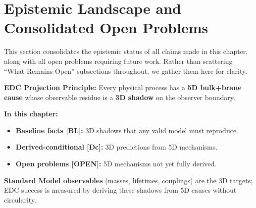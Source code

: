 
\section{Epistemic Landscape and Consolidated Open Problems}
\label{sec:epistemic_map}

This section consolidates the epistemic status of all claims made in this chapter,
along with all open problems requiring future work. Rather than scattering ``What
Remains Open'' subsections throughout, we gather them here for clarity.

\begin{tcolorbox}[breakable, enhanced, colback=blue!3!white, colframe=blue!50!black,
    title=\textbf{Framework 2.0 Language Compliance}, width=\linewidth]
\small
\textbf{EDC Projection Principle:} Every physical process has a \textbf{5D bulk+brane cause}
whose observable residue is a \textbf{3D shadow} on the observer boundary.

\textbf{In this chapter:}
\begin{itemize}[nosep]
    \item \textbf{Baseline facts [BL]:} 3D shadows that any valid model must reproduce.
    \item \textbf{Derived-conditional [Dc]:} 3D predictions from 5D mechanisms.
    \item \textbf{Open problems [OPEN]:} 5D mechanisms not yet fully derived.
\end{itemize}

\textbf{Standard Model observables} (masses, lifetimes, couplings) are the 3D targets;
EDC success is measured by deriving these shadows from 5D causes without circularity.
\end{tcolorbox}

